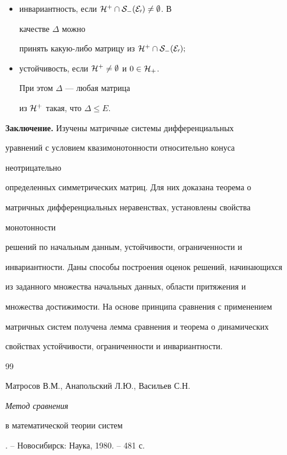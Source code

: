 {\begin{thm}
\begin{itemize}
\item[б)] инвариантность, если $\cal H^+\cap S_-(E_0)\ne\emptyset$. В 


качестве $\Delta$ можно 


принять какую-либо матрицу из $\cal H^+\cap S_-(E_0);$ 


\item[в)] устойчивость, если $\cal H^+\ne\emptyset$ и $0\in\cal H_+$. 


При этом $\Delta$ --- любая матрица 


из $\cal H^+$ такая, что $\Delta\le E$. 


\end{itemize} 


\end{thm} 


 


{\bf Заключение.} Изучены матричные системы дифференциальных 


уравнений с условием квазимонотонности относительно конуса 


неотрицательно 


определенных симметрических матриц. Для них доказана теорема о 


матричных дифференциальных неравенствах, установлены свойства 


монотонности 


решений по начальным данным, устойчивости, ограниченности и 


инвариантности. Даны способы построения оценок решений, начинающихся 


из заданного множества начальных данных, области притяжения и 


множества достижимости. На основе принципа сравнения с применением 


матричных систем получена лемма сравнения и теорема о динамических 


свойствах устойчивости, ограниченности и инвариантности. 


 


\begin{thebibliography}{99} 


 




Матросов В.М., Анапольский Л.Ю., Васильев С.Н. {\em Метод сравнения 


в математической теории систем}. -- Новосибирск: Наука, 1980. -- 481 с. 



\end{thebibliography}}
